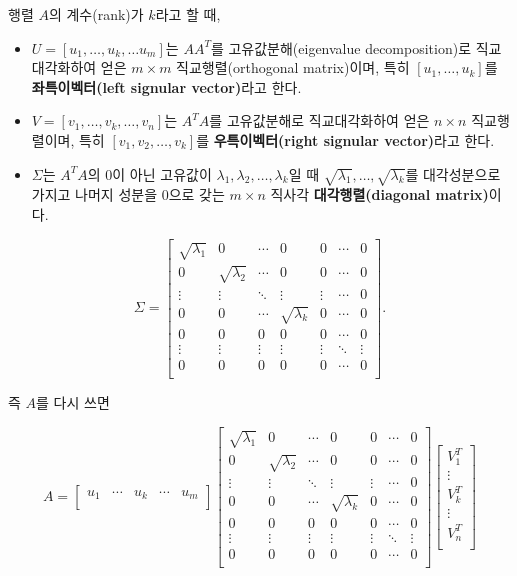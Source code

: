 \documentclass[b5paper,]{scrbook}
\theoremstyle{plain}
\theoremstyle{definition}
\numberwithin{equation}{section}
\begin{document}
행렬 \(A\)의 계수(rank)가 \(k\)라고 할 때,

\begin{itemize}
\item
  \(U=[u_{1},\ldots , u_{k}, \ldots u_{m}]\)는 \(AA^{T}\)를
  고유값분해(eigenvalue decomposition)로 직교대각화하여 얻은
  \(m\times m\) 직교행렬(orthogonal matrix)이며, 특히
  \([u_{1},\ldots, u_{k}]\)를 \textbf{좌특이벡터(left signular
  vector)}라고 한다.
\item
  \(V=[v_{1},\ldots ,v_{k},\ldots , v_{n}]\)는 \(A^{T}A\)를 고유값분해로
  직교대각화하여 얻은 \(n\times n\) 직교행렬이며, 특히
  \([v_{1},v_{2},\ldots ,v_{k}]\)를 \textbf{우특이벡터(right signular
  vector)}라고 한다.
\item
  \(\Sigma\)는 \(A^{T}A\)의 0이 아닌 고유값이
  \(\lambda_{1},\lambda_{2},\ldots , \lambda_{k}\)일 때
  \(\sqrt{\lambda_{1}},\ldots, \sqrt{\lambda_{k}}\)를 대각성분으로
  가지고 나머지 성분을 0으로 갖는 \(m\times n\) 직사각
  \textbf{대각행렬(diagonal matrix)}이다.
\end{itemize}

\[
\Sigma=
\begin{bmatrix}
\sqrt{\lambda_{1}} & 0 & \cdots & 0 & 0 & \cdots & 0\\
0 & \sqrt{\lambda_{2}} & \cdots & 0 & 0 & \cdots & 0\\
\vdots & \vdots & \ddots & \vdots & \vdots & \cdots & 0\\
0 & 0 & \cdots & \sqrt{\lambda_{k}} & 0 & \cdots & 0\\
0 & 0 & 0 & 0 & 0 & \cdots & 0\\
\vdots & \vdots & \vdots & \vdots & \vdots & \ddots & \vdots\\
0 & 0 & 0 & 0 & 0 & \cdots & 0\\
\end{bmatrix}.
\]

즉 \(A\)를 다시 쓰면

\[
A=
\begin{bmatrix}
u_{1} & \cdots & u_{k} & \cdots & u_{m}\\
\end{bmatrix}
\begin{bmatrix}
\sqrt{\lambda_{1}} & 0 & \cdots & 0 & 0 & \cdots & 0\\
0 & \sqrt{\lambda_{2}} & \cdots & 0 & 0 & \cdots & 0\\
\vdots & \vdots & \ddots & \vdots & \vdots & \cdots & 0\\
0 & 0 & \cdots & \sqrt{\lambda_{k}} & 0 & \cdots & 0\\
0 & 0 & 0 & 0 & 0 & \cdots & 0\\
\vdots & \vdots & \vdots & \vdots & \vdots & \ddots & \vdots\\
0 & 0 & 0 & 0 & 0 & \cdots & 0\\
\end{bmatrix}
\begin{bmatrix}
V_{1}^{T}\\
\vdots \\
V_{k}^{T}\\
\vdots\\
V_{n}^{T}\\
\end{bmatrix}
\]
\end{document}
